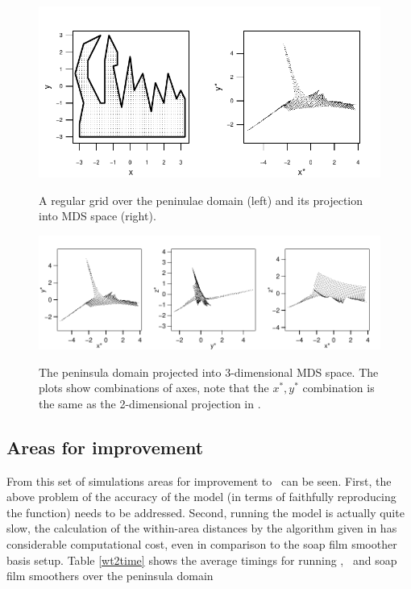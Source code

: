 {%
\begin{figure}
\centering
\includegraphics[width=6in]{mds/figs/wt2-2d-proj.pdf} \\
\caption{A regular grid over the peninulae domain (left) and its projection into MDS space (right).}
\label{wt2-2d-proj}
\end{figure}

\begin{figure}
\centering
\includegraphics[width=9in]{mds/figs/wt2-3d-proj.pdf} \\
\caption{The peninsula domain projected into 3-dimensional MDS space. The plots show combinations of axes, note that the $x^*,y^*$ combination is the same as the 2-dimensional projection in .}
\label{wt2-3d-proj}
\end{figure}

\subsection{Areas for improvement}

From this set of simulations areas for improvement to \mdsap\ can be seen. First, the above problem of the accuracy of the model (in terms of faithfully reproducing the function) needs to be addressed. Second, running the model is actually quite slow, the calculation of the within-area distances by the algorithm given in  has considerable computational cost, even in comparison to the soap film smoother basis setup. Table \ref{wt2time} shows the average timings for running \mdsap, \tprs\ and soap film smoothers over the peninsula domain

}
